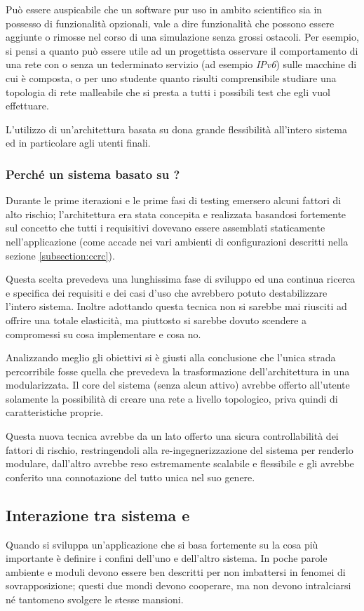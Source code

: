 Può essere auspicabile che un software pur uso in ambito scientifico sia in possesso di funzionalità opzionali, vale a dire funzionalità che possono essere aggiunte o rimosse nel corso di una simulazione senza grossi ostacoli. Per esempio, si pensi a quanto può essere utile ad un progettista osservare il comportamento di una rete con o senza un tederminato servizio (ad esempio \emph{IPv6}) sulle macchine di cui è composta, o per uno studente quanto risulti comprensibile studiare una topologia di rete malleabile che si presta a tutti i possibili test che egli vuol effettuare.

L'utilizzo di un'architettura basata su \plugin{} dona grande flessibilità all'intero sistema ed in particolare agli utenti finali.

\subsubsection{Perché un sistema basato su \plugin{}?}
Durante le prime iterazioni e le prime fasi di testing emersero alcuni fattori di alto rischio; l'architettura era stata concepita e realizzata basandosi fortemente sul concetto che tutti i requisitivi dovevano essere assemblati staticamente nell'applicazione (come accade nei vari ambienti di configurazioni descritti nella sezione \ref{subsection:ccrc}).

Questa scelta prevedeva una lunghissima fase di sviluppo ed una continua ricerca e specifica dei requisiti e dei casi d'uso che avrebbero potuto destabilizzare l'intero sistema. Inoltre adottando questa tecnica non si sarebbe mai riusciti ad offrire una totale elasticità, ma piuttosto si sarebbe dovuto scendere a compromessi su cosa implementare e cosa no.

Analizzando meglio gli obiettivi si è giusti alla conclusione che l'unica strada percorribile fosse quella che prevedeva la trasformazione dell'architettura in una modularizzata. Il core del sistema (senza alcun \plugin{} attivo) avrebbe offerto all'utente solamente la possibilità di creare una rete a livello topologico, priva quindi di caratteristiche proprie.

Questa nuova tecnica avrebbe da un lato offerto una sicura controllabilità dei fattori di rischio, restringendoli alla re-ingegnerizzazione del sistema per renderlo modulare, dall'altro avrebbe reso \visualnetkit{} estremamente scalabile e flessibile e gli avrebbe conferito una connotazione del tutto unica nel suo genere.

\subsection{Interazione tra sistema e \plugin{}}
Quando si sviluppa un'applicazione che si basa fortemente su \plugin{} la cosa più importante è definire i confini dell'uno e dell'altro sistema. In poche parole ambiente e moduli devono essere ben descritti per non imbattersi in fenomei di sovrapposizione; questi due mondi devono cooperare, ma non devono intralciarsi né tantomeno svolgere le stesse mansioni.


